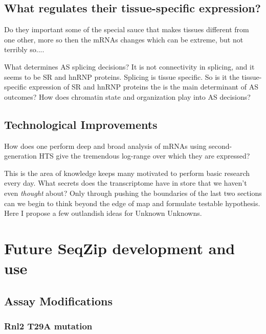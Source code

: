   \subsection{What regulates their tissue-specific expression?}
    Do they important some of the special sauce that makes tissues different from one other, more so then the mRNAs changes which can be extreme, but not terribly so....

    What determines AS splicing decisions? It is not connectivity in splicing, and it seems to be SR and hnRNP proteins. Splicing is tissue specific. So is it the tissue-specific expression of SR and hnRNP proteins the is the main determinant of AS outcomes? How does chromatin state and organization play into AS decisions? 

  \subsection{Technological Improvements}
    How does one perform deep and broad analysis of mRNAs using second-generation HTS give the tremendous log-range over which they are expressed?

    This is the area of knowledge keeps many motivated to perform basic research every day. What secrets does the transcriptome have in store that we haven't even \textit{thought} about? Only through pushing the boundaries of the last two sections can we begin to think beyond the edge of map and formulate testable hypothesis. Here I propose a few outlandish ideas for Unknown Unknowns. 

\section{Future SeqZip development and use}

  \subsection{Assay Modifications}

    \subsubsection{Rnl2 T29A mutation}


